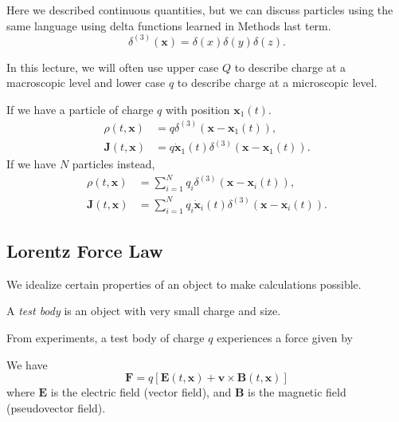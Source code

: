     Here we described continuous quantities, but we can discuss particles using the same language using delta functions learned in Methods last term.
    \[
        \delta^{(3)}(\mathbf{x}) = \delta(x)\delta(y)\delta(z).
    \]
    \begin{note}
        In this lecture, we will often use upper case \(Q\) to describe charge at a macroscopic level and lower case \(q\) to describe charge at a microscopic level.
    \end{note}
    If we have a particle of charge \(q\) with position \(\mathbf{x}_1 (t)\).
    \begin{align*}
        \rho(t, \mathbf{x}) &= q\delta^{(3)}(\mathbf{x} - \mathbf{x}_1(t)),\\
        \mathbf{J} (t,\mathbf{x}) &= q \dot{\mathbf{x}}_1(t)\delta^{(3)}(\mathbf{x} - \mathbf{x} _1(t)).
    \end{align*}
    If we have \(N\) particles instead,
    \begin{align*}
        \rho(t, \mathbf{x}) &= \sum\limits_{i=1}^{N} q_i\delta^{(3)}(\mathbf{x} - \mathbf{x}_i(t)),\\
        \mathbf{J} (t,\mathbf{x}) &= \sum\limits_{i=1}^{N} q_i \dot{\mathbf{x}}_i(t)\delta^{(3)}(\mathbf{x} - \mathbf{x} _i(t)). 
    \end{align*}
\subsection{Lorentz Force Law}
We idealize certain properties of an object to make calculations possible.
\begin{definition}
    A \textit{test body} is an object with very small charge and size.
\end{definition}
From experiments, a test body of charge \(q\) experiences a force given by
\begin{theorem}
    We have
    \[\textbf{F} = q[\textbf{E}(t, \textbf{x}) + \textbf{v}\times \textbf{B}(t, \textbf{x})]\]
    where \(\mathbf{E} \) is the electric field (vector field), and \(\mathbf{B} \) is the magnetic field (pseudovector field).
\end{theorem}

